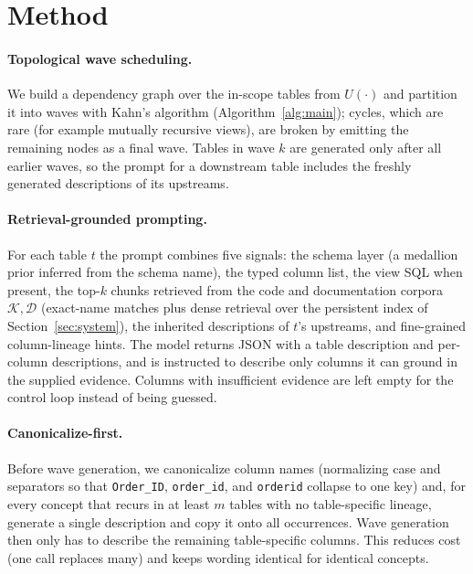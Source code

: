 \section{Method}\label{sec:method}
\paragraph{Topological wave scheduling.} We build a dependency graph over the in-scope
tables from $U(\cdot)$ and partition it into waves with Kahn's algorithm
(Algorithm~\ref{alg:main}); cycles, which are rare (for example mutually recursive views),
are broken by emitting the remaining nodes as a final wave. Tables in wave $k$ are
generated only after all earlier waves, so the prompt for a downstream table includes the
freshly generated descriptions of its upstreams.

\paragraph{Retrieval-grounded prompting.} For each table $t$ the prompt combines five
signals: the schema layer (a medallion prior inferred from the schema name), the typed
column list, the view SQL when present, the top-$k$ chunks retrieved from the code and
documentation corpora $\mathcal{K},\mathcal{D}$ (exact-name matches plus dense retrieval
over the persistent index of Section~\ref{sec:system}), the inherited descriptions of
$t$'s upstreams, and fine-grained column-lineage hints. The model returns JSON with a table
description and per-column descriptions, and is instructed to describe only columns it can
ground in the supplied evidence. Columns with insufficient evidence are left empty for the
control loop instead of being guessed.

\paragraph{Canonicalize-first.} Before wave generation, we canonicalize column names
(normalizing case and separators so that \texttt{Order\_ID}, \texttt{order\_id}, and
\texttt{orderid} collapse to one key) and, for every concept that recurs in at least $m$
tables with no table-specific lineage, generate a single description and copy it onto all
occurrences. Wave generation then only has to describe the remaining table-specific
columns. This reduces cost (one call replaces many) and keeps wording identical for
identical concepts.

